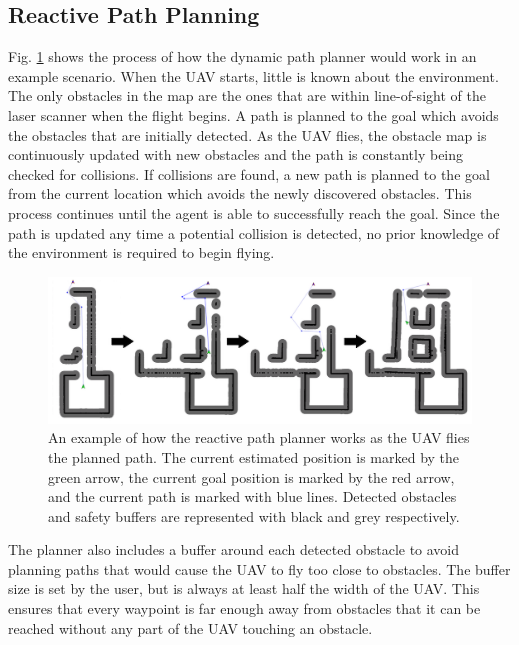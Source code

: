 \documentclass[letterpaper, 10 pt, conference]{ieeeconf}  %
\begin{document}
\subsection{Reactive Path Planning}

Fig. \ref{fig:reactive_plan} shows the process of how the dynamic path planner would work in an example scenario. When the UAV starts, little is known about the environment. The only obstacles in the map are the ones that are within line-of-sight of the laser scanner when the flight begins. A path is planned to the goal which avoids the obstacles that are initially detected. As the UAV flies, the obstacle map is continuously updated with new obstacles and the path is constantly being checked for collisions. If collisions are found, a new path is planned to the goal from the current location which avoids the newly discovered obstacles. This process continues until the agent is able to successfully reach the goal. Since the path is updated any time a potential collision is detected, no prior knowledge of the environment is required to begin flying.

\begin{figure}
\centering
\includegraphics[width=1.0\linewidth]{adaptive_path_plan2.png}
\caption{An example of how the reactive path planner works as the UAV flies the planned path. The current estimated position is marked by the green arrow, the current goal position is marked by the red arrow, and the current path is marked with blue lines. Detected obstacles and safety buffers are represented with black and grey respectively.}
\label{fig:reactive_plan}
\end{figure}

The planner also includes a buffer around each detected obstacle to avoid planning paths that would cause the UAV to fly too close to obstacles. The buffer size is set by the user, but is always at least half the width of the UAV. This ensures that every waypoint is far enough away from obstacles that it can be reached without any part of the UAV touching an obstacle.
\end{document}
